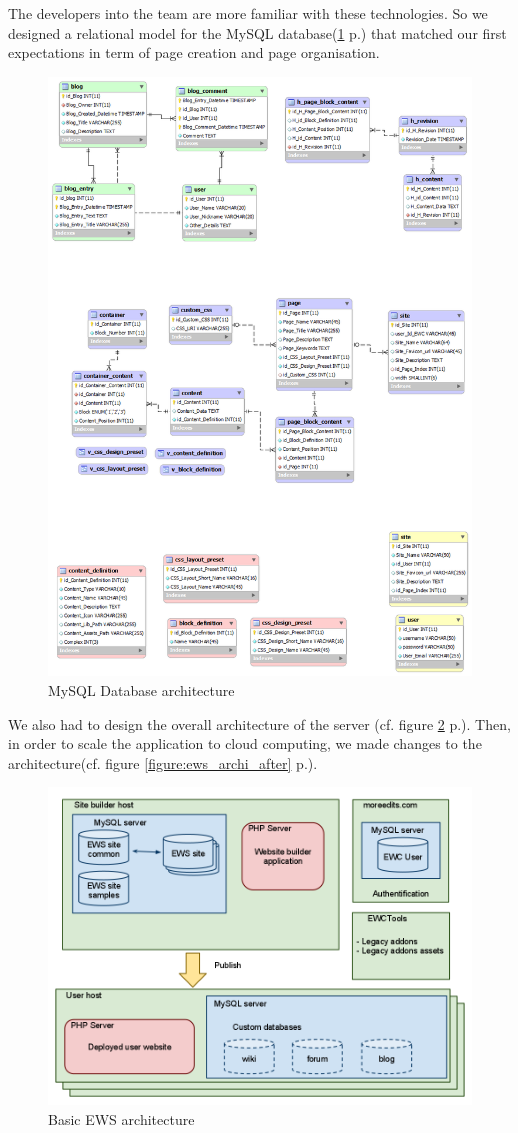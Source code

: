 The developers into the team are more familiar with these technologies. So we designed a relational model for the MySQL database(\ref{figure:ews_rev_eng_dec} p.\pageref{figure:ews_rev_eng_dec}) that matched our first expectations in term of page creation and page organisation.
\begin{figure}[h!]
\centering
\includegraphics[width=.55\textwidth]{img/reverse_eng_15-dec-2010.png}
\caption{MySQL Database architecture }
\label{figure:ews_rev_eng_dec}
\end{figure}
We also had to design the overall architecture of the server (cf. figure \ref{figure:ews_archi_before} p.\pageref{figure:ews_archi_before}). Then, in order to scale the application to cloud computing, we made changes to the architecture(cf. figure \ref{figure:ews_archi_after} p.\pageref{figure:ews_archi_after}).


\begin{figure}[h!]
\centering
\includegraphics[width=.55\textwidth]{img/ews_archi_before.png}
\caption{Basic EWS architecture }
\label{figure:ews_archi_before}
\end{figure}

